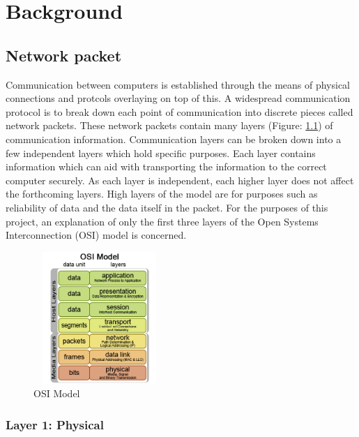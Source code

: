 \chapter{Background}\label{C:back}

\section{Network packet}

\par Communication between computers is established through the means of physical connections and protcols overlaying on top of this. 
A widespread communication protocol is to break down each point of communication into discrete pieces called network packets.
These network packets contain many layers (Figure: \ref{fig:OSIModel}) of communication information.
Communication layers can be broken down into a few independent layers which hold specific purposes. 
Each layer contains information which can aid with transporting the information to the correct computer securely.
As each layer is independent, each higher layer does not affect the forthcoming layers.
High layers of the model are for purposes such as reliability of data and the data itself in the packet.
For the purposes of this project, an explanation of only the first three layers of the Open Systems Interconnection (OSI) model is concerned.

\begin{figure}[H]
    \begin{center}
        \includegraphics[width=5cm,height=5cm,keepaspectratio]{Images/OSIModel.png}
        \caption{OSI Model}
        \label{fig:OSIModel}
    \end{center}
\end{figure}

\subsection{Layer 1: Physical}

